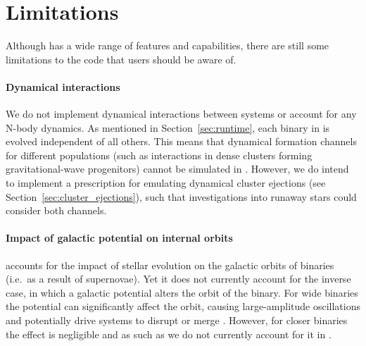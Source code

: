 \documentclass[twocolumn, twocolappendix, oneside, linenumbers]{aastex631}
\begin{document}



\section{Limitations}\label{sec:limitations}

Although \cogsworth has a wide range of features and capabilities, there are still some limitations to the code that users should be aware of.

\paragraph{Dynamical interactions} We do not implement dynamical interactions between systems or account for any N-body dynamics. As mentioned in Section~\ref{sec:runtime}, each binary in \cogsworth is evolved independent of all others. This means that dynamical formation channels for different populations (such as interactions in dense clusters forming gravitational-wave progenitors) cannot be simulated in \cogsworth. However, we do intend to implement a prescription for emulating dynamical cluster ejections (see Section~\ref{sec:cluster_ejections}), such that investigations into runaway stars could consider both channels.

\paragraph{Impact of galactic potential on internal orbits} \cogsworth accounts for the impact of stellar evolution on the galactic orbits of binaries (i.e.\ as a result of supernovae). Yet it does not currently account for the inverse case, in which a galactic potential alters the orbit of the binary. For wide binaries the potential can significantly affect the orbit, causing large-amplitude oscillations and potentially drive systems to disrupt or merge \citep[e.g.,][]{Weinberg+1987:1987ApJ...312..367W,Heisler+1986:1986Icar...65...13H,Jiang+2010:2010MNRAS.401..977J,Modak+2023:2023MNRAS.524.3102M,Stegmann+2024:2024arXiv240502912S}. However, for closer binaries the effect is negligible and as such as we do not currently account for it in \cogsworth.
\end{document}
